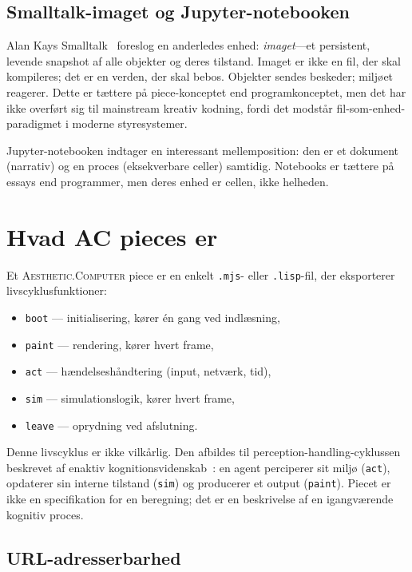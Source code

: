 \documentclass[10pt,letterpaper,twocolumn]{article}
\newcommand{\ac}{\textsc{Aesthetic.Computer}}
\begin{document}
\subsection{Smalltalk-imaget og Jupyter-notebooken}

Alan Kays Smalltalk~\citep{kay1977personal} foreslog en anderledes enhed: \emph{imaget}---et persistent, levende snapshot af alle objekter og deres tilstand. Imaget er ikke en fil, der skal kompileres; det er en verden, der skal bebos. Objekter sendes beskeder; miljøet reagerer. Dette er tættere på piece-konceptet end programkonceptet, men det har ikke overført sig til mainstream kreativ kodning, fordi det modstår fil-som-enhed-paradigmet i moderne styresystemer.

Jupyter-notebooken indtager en interessant mellemposition: den er et dokument (narrativ) og en proces (eksekverbare celler) samtidig. Notebooks er tættere på essays end programmer, men deres enhed er cellen, ikke helheden.

\section{Hvad AC pieces er}

Et \ac{} piece er en enkelt \texttt{.mjs}- eller \texttt{.lisp}-fil, der eksporterer livscyklusfunktioner:

\begin{itemize}
  \item \texttt{boot} --- initialisering, kører én gang ved indlæsning,
  \item \texttt{paint} --- rendering, kører hvert frame,
  \item \texttt{act} --- hændelseshåndtering (input, netværk, tid),
  \item \texttt{sim} --- simulationslogik, kører hvert frame,
  \item \texttt{leave} --- oprydning ved afslutning.
\end{itemize}

Denne livscyklus er ikke vilkårlig. Den afbildes til perception-handling-cyklussen beskrevet af enaktiv kognitionsvidenskab~\citep{varela1991embodied}: en agent perciperer sit miljø (\texttt{act}), opdaterer sin interne tilstand (\texttt{sim}) og producerer et output (\texttt{paint}). Piecet er ikke en specifikation for en beregning; det er en beskrivelse af en igangværende kognitiv proces.

\subsection{URL-adresserbarhed}
\end{document}
